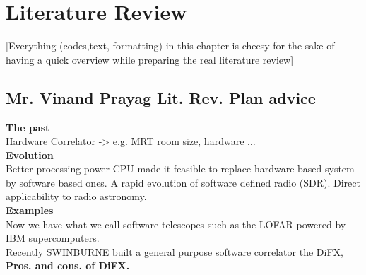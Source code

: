 \chapter{Literature Review}
\label{litReview}

[Everything (codes,text, formatting) in this chapter is cheesy for the sake of having a quick overview while preparing the real literature review]
\section{Mr. Vinand Prayag Lit. Rev. Plan advice}
\textbf{The past}\\
Hardware Correlator -> e.g. MRT room size, hardware $\ldots$\\
\textbf{Evolution}\\
Better processing power CPU made it feasible to replace hardware based system by software based ones. 
A rapid evolution of software defined radio (SDR). Direct applicability to radio astronomy.\\
\textbf{Examples}\\
Now we have what we call software telescopes such as the LOFAR powered by IBM supercomputers.\\
Recently SWINBURNE built a general purpose software correlator the DiFX,\\
\textbf{Pros. and cons. of DiFX.}



